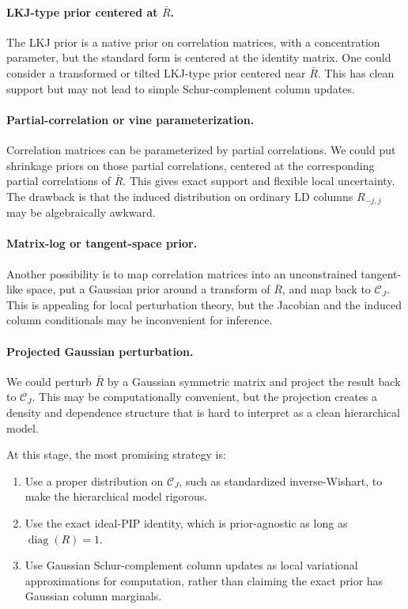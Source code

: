\documentclass[11pt]{article}
\newcommand{\Rbar}{\bar R}
\newcommand{\diag}{\operatorname{diag}}
\begin{document}
\paragraph{LKJ-type prior centered at \(\Rbar\).}
The LKJ prior is a native prior on correlation matrices, with a concentration
parameter, but the standard form is centered at the identity matrix. One could
consider a transformed or tilted LKJ-type prior centered near \(\Rbar\). This
has clean support but may not lead to simple Schur-complement column updates.

\paragraph{Partial-correlation or vine parameterization.}
Correlation matrices can be parameterized by partial correlations. We could
put shrinkage priors on those partial correlations, centered at the
corresponding partial correlations of \(\Rbar\). This gives exact support and
flexible local uncertainty. The drawback is that the induced distribution on
ordinary LD columns \(R_{-j,j}\) may be algebraically awkward.

\paragraph{Matrix-log or tangent-space prior.}
Another possibility is to map correlation matrices into an unconstrained
tangent-like space, put a Gaussian prior around a transform of \(\Rbar\), and
map back to \(\mathcal C_J\). This is appealing for local perturbation theory,
but the Jacobian and the induced column conditionals may be inconvenient for
inference.

\paragraph{Projected Gaussian perturbation.}
We could perturb \(\Rbar\) by a Gaussian symmetric matrix and project the
result back to \(\mathcal C_J\). This may be computationally convenient, but
the projection creates a density and dependence structure that is hard to
interpret as a clean hierarchical model.

At this stage, the most promising strategy is:
\begin{enumerate}[leftmargin=*]
\item Use a proper distribution on \(\mathcal C_J\), such as standardized
inverse-Wishart, to make the hierarchical model rigorous.
\item Use the exact ideal-PIP identity, which is prior-agnostic as long as
\(\diag(R)=1\).
\item Use Gaussian Schur-complement column updates as local variational
approximations for computation, rather than claiming the exact prior has
Gaussian column marginals.
\end{enumerate}
\end{document}
